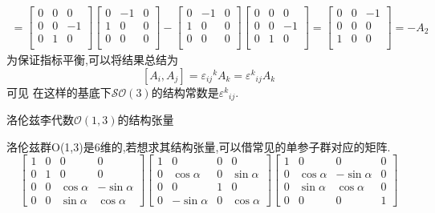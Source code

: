 \documentclass[../main.tex]{subfiles}
\begin{document}
 \begin{align*}
 [A_1,A_3] = \begin{bmatrix}
     0&0&0\\    
     0&0&-1\\
     0&1&0\\    
 \end{bmatrix} \begin{bmatrix}
     0&-1&0\\    
     1&0&0\\
     0&0&0\\    
 \end{bmatrix}-
 \begin{bmatrix}
     0&-1&0\\    
     1&0&0\\
     0&0&0\\    
 \end{bmatrix} \begin{bmatrix}
     0&0&0\\    
     0&0&-1\\
     0&1&0\\    
 \end{bmatrix}= \begin{bmatrix}
     0&0&-1\\    
     0&0&0\\
     1&0&0\\    
 \end{bmatrix}
 =-A_2
 \end{align*}
 为保证指标平衡,可以将结果总结为$$[A_i,A_j] = \varepsilon_{ij}{}^kA_k = \varepsilon ^k{}_{ij}A_k$$可见
 在这样的基底下$\mathscr{SO}(3)$的结构常数是$\varepsilon^k{}_{ij}$.
 \begin{example}
     洛伦兹李代数$\mathscr{O}(1,3)$的结构张量
 \end{example}
     洛伦兹群O(1,3)是6维的,若想求其结构张量,可以借常见的单参子群对应的矩阵.
     $$\begin{bmatrix}
     1 & 0 & 0 & 0 \\
     0 & 1 & 0 & 0 \\
     0 & 0 & \cos \alpha & -\sin \alpha \\
     0 & 0 & \sin \alpha & \cos \alpha
     \end{bmatrix}
     \begin{bmatrix}
     1 & 0 & 0 & 0 \\
     0 & \cos \alpha & 0 & \sin \alpha \\
     0 & 0 & 1 & 0 \\
     0 & -\sin \alpha & 0 & \cos \alpha
     \end{bmatrix}
     \begin{bmatrix}
     1 & 0 & 0 & 0 \\
     0 & \cos \alpha & -\sin \alpha & 0 \\
     0 & \sin \alpha & \cos \alpha & 0 \\
     0 & 0 & 0 & 1
     \end{bmatrix}$$
\end{document}
